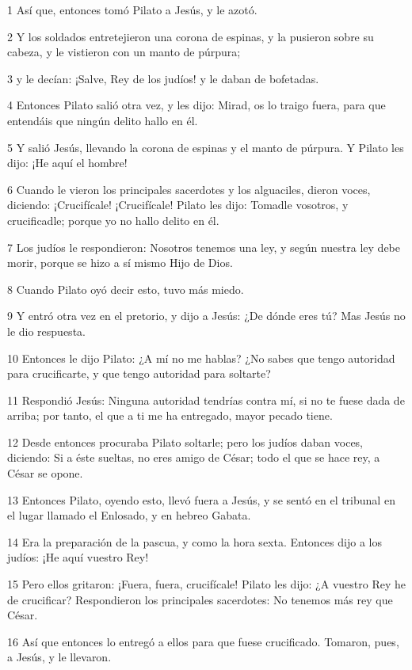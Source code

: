 \par 1 Así que, entonces tomó Pilato a Jesús, y le azotó.
\par 2 Y los soldados entretejieron una corona de espinas, y la pusieron sobre su cabeza, y le vistieron con un manto de púrpura;
\par 3 y le decían: ¡Salve, Rey de los judíos! y le daban de bofetadas.
\par 4 Entonces Pilato salió otra vez, y les dijo: Mirad, os lo traigo fuera, para que entendáis que ningún delito hallo en él.
\par 5 Y salió Jesús, llevando la corona de espinas y el manto de púrpura. Y Pilato les dijo: ¡He aquí el hombre!
\par 6 Cuando le vieron los principales sacerdotes y los alguaciles, dieron voces, diciendo: ¡Crucifícale! ¡Crucifícale! Pilato les dijo: Tomadle vosotros, y crucificadle; porque yo no hallo delito en él.
\par 7 Los judíos le respondieron: Nosotros tenemos una ley, y según nuestra ley debe morir, porque se hizo a sí mismo Hijo de Dios.
\par 8 Cuando Pilato oyó decir esto, tuvo más miedo.
\par 9 Y entró otra vez en el pretorio, y dijo a Jesús: ¿De dónde eres tú? Mas Jesús no le dio respuesta.
\par 10 Entonces le dijo Pilato: ¿A mí no me hablas? ¿No sabes que tengo autoridad para crucificarte, y que tengo autoridad para soltarte?
\par 11 Respondió Jesús: Ninguna autoridad tendrías contra mí, si no te fuese dada de arriba; por tanto, el que a ti me ha entregado, mayor pecado tiene.
\par 12 Desde entonces procuraba Pilato soltarle; pero los judíos daban voces, diciendo: Si a éste sueltas, no eres amigo de César; todo el que se hace rey, a César se opone.
\par 13 Entonces Pilato, oyendo esto, llevó fuera a Jesús, y se sentó en el tribunal en el lugar llamado el Enlosado, y en hebreo Gabata.
\par 14 Era la preparación de la pascua, y como la hora sexta. Entonces dijo a los judíos: ¡He aquí vuestro Rey!
\par 15 Pero ellos gritaron: ¡Fuera, fuera, crucifícale! Pilato les dijo: ¿A vuestro Rey he de crucificar? Respondieron los principales sacerdotes: No tenemos más rey que César.
\par 16 Así que entonces lo entregó a ellos para que fuese crucificado. Tomaron, pues, a Jesús, y le llevaron.

